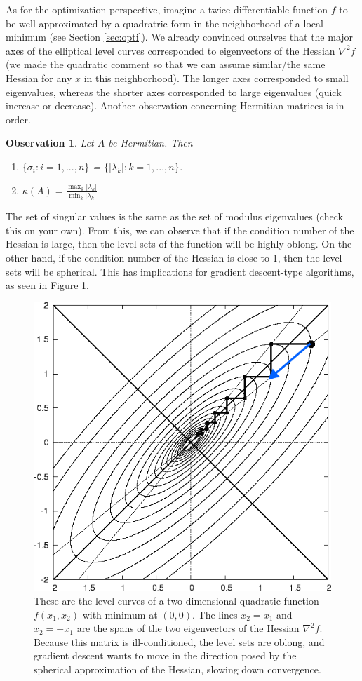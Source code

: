 \documentclass[11pt]{article}
\theoremstyle{plain}
\newtheorem{obs}{Observation}[section]
\theoremstyle{definition}
\theoremstyle{remark}
\begin{document}
As for the optimization perspective, imagine a twice-differentiable function $f$ to be well-approximated by a quadratric form in the neighborhood of a local minimum (see Section \ref{sec:opti}). We already convinced ourselves that the major axes of the elliptical level curves corresponded to eigenvectors of the Hessian $\nabla^2 f$ (we made the quadratic comment so that we can assume similar/the same Hessian for any $x$ in this neighborhood). The longer axes corresponded to small eigenvalues, whereas the shorter axes corresponded to large eigenvalues (quick increase or decrease). Another observation concerning Hermitian matrices is in order.
\begin{obs}
    Let $A$ be Hermitian. Then
    \begin{enumerate}
        \item $\{\sigma_i : i = 1, ..., n\}$ = $\{|\lambda_k| : k = 1, ..., n\}$.
        \item $\kappa(A) = \frac{\max_k |\lambda_k|}{\min_k |\lambda_k|}$
    \end{enumerate}
\end{obs}
The set of singular values is the same as the set of modulus eigenvalues (check this on your own). From this, we can observe that if the condition number of the Hessian is large, then the level sets of the function will be highly oblong. On the other hand, if the condition number of the Hessian is close to 1, then the level sets will be spherical. This has implications for gradient descent-type algorithms, as seen in Figure \ref{fig:grad_desc}.
\begin{figure}
    \centering
    \includegraphics[width=0.8\linewidth]{figures/grad_desc.png}
    \caption{These are the level curves of a two dimensional quadratic function $f(x_1, x_2)$ with minimum at $(0,0)$. The lines $x_2 = x_1$ and $x_2 = -x_1$ are the spans of the two eigenvectors of the Hessian $\nabla^2 f$. Because this matrix is ill-conditioned, the level sets are oblong, and gradient descent wants to move in the direction posed by the spherical approximation of the Hessian, slowing down convergence.}
    \label{fig:grad_desc}
\end{figure}
\end{document}
